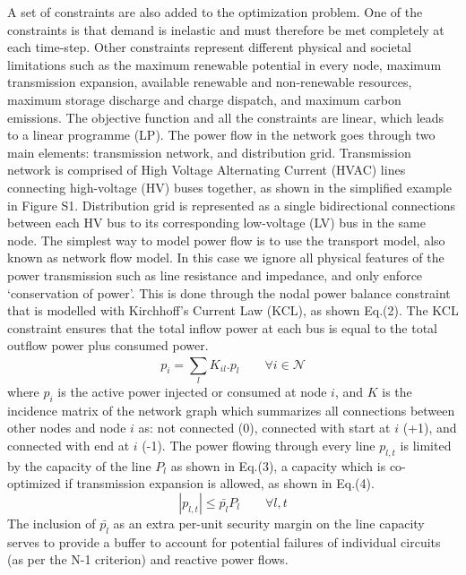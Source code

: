 	A set of constraints are also added to the optimization problem. One of the constraints is that demand is inelastic and must therefore be met completely at each time-step. Other constraints represent different physical and societal limitations such as the maximum renewable potential in every node, maximum transmission expansion, available renewable and non-renewable resources, maximum storage discharge and charge dispatch, and maximum carbon emissions. The objective function and all the constraints are linear, which leads to a linear programme (LP). 
	The power flow in the network goes through two main elements: transmission network, and distribution grid. 
	Transmission network is comprised of High Voltage Alternating Current (HVAC) lines connecting high-voltage (HV) buses together, as shown in the simplified example in Figure S1. Distribution grid is represented as a single bidirectional connections between each HV bus to its corresponding low-voltage (LV) bus in the same node. 
	The simplest way to model power flow is to use the transport model, also known as network flow model. In this case we ignore all physical features of the power transmission such as line resistance and impedance, and only enforce ‘conservation of power’. This is done through the nodal power balance constraint that is modelled with Kirchhoff’s Current Law (KCL), as shown Eq.(2). The KCL constraint ensures that the total inflow power at each bus is equal to the total outflow power plus consumed power.
	\begin{equation}
		p_{i} = \sum_{l}^{} K_{il}.p_{l}   \quad\quad   \forall i \in \mathcal{N}
	\end{equation}
	where \(p_{i}\) is the active power injected or consumed at node \(i\), and \(K\) is the incidence matrix of the network graph which summarizes all connections between other nodes and node \(i\) as: not connected (0), connected with start at \(i\) (+1), and connected with end at \(i\) (-1). The power flowing through every line \(p_{l,t}\) is limited by the capacity of the line \(P_{l}\) as shown in Eq.(3), a capacity which is co-optimized if transmission expansion is allowed, as shown in Eq.(4).
	\begin{equation}
		\left | p_{l,t}  \right | \leq \bar{{p_{l}}}P_{l} \quad\quad   \forall l,t
	\end{equation}
	The inclusion of  \(\bar{p_{l}}\) as an extra per-unit security margin on the line capacity serves to provide a buffer to account for potential failures of individual circuits (as per the N-1 criterion) and reactive power flows. 

